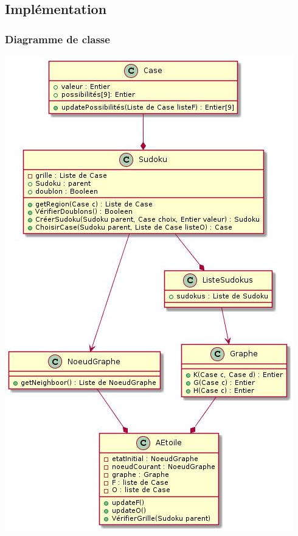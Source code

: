         \subsection{Implémentation}
            \subsubsection{Diagramme de classe}
                \begin{center}
                    \includegraphics[scale = 0.5]{images/AstarDiagrammeClasse.png}
                \end{center}
                \bigskip
